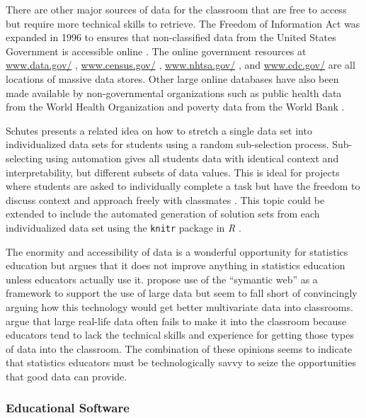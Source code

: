 There are other major sources of data for the classroom that are free to access but require more technical skills to retrieve.  The Freedom of Information Act was expanded in 1996 to ensures that non-classified data from the United States Government is accessible online \citep{FOIA}.  The online government resources at \url{www.data.gov/} \citep{DataGov}, \url{www.census.gov/} \citep{Census}, \url{www.nhtsa.gov/} \citep{NHTSA}, and \url{www.cdc.gov/} \citep{CDC} are all locations of massive data stores. Other large online databases have also been made available by non-governmental organizations such as public health data from the World Health Organization \citep{WHO} and poverty data from the World Bank  \citep{WorldBank}.

Schutes presents a related idea on how to stretch a single data set into individualized data sets for students using a random sub-selection process. Sub-selecting using automation gives all students data with identical context and interpretability, but different subsets of data values. This is ideal for projects where  students are asked to individually complete a task but have the freedom to discuss  context and approach freely with classmates \citep{Schutes2009}.  This topic could be extended to include the automated generation of solution sets from each individualized data set using the \texttt{knitr} package in \textit{R} \citep{Yihui}.

The enormity and accessibility of  data is a wonderful opportunity for statistics education but \citet{Nicholson2013} argues that it does not improve anything in statistics education unless educators actually use it. \citet{Ridgeway2013} propose use of the ``symantic web'' as a framework to support the use of large data but seem to fall short of convincingly arguing how this technology would get better multivariate data into classrooms. \citet{Finzer2007} argue that large real-life data often fails to make it into the classroom because educators tend to lack the technical skills and experience for getting those types of data into the classroom. The combination of these opinions seems to indicate that statistics educators must be technologically savvy to seize the opportunities that good data can provide.

\subsubsection{Educational Software} 

